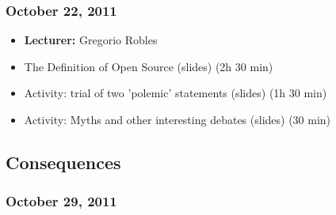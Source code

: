 \documentclass[a4paper]{article}
\begin{document}
\subsubsection{October 22, 2011}

\begin{itemize}
\item \textbf{Lecturer:} Gregorio Robles

\item The Definition of Open Source (slides) (2h 30 min)

\item Activity: trial of two 'polemic' statements (slides) (1h 30 min)

\item Activity: Myths and other interesting debates (slides) (30 min)

\end{itemize}

\subsection{Consequences}


\subsubsection{October 29, 2011}
\end{document}
